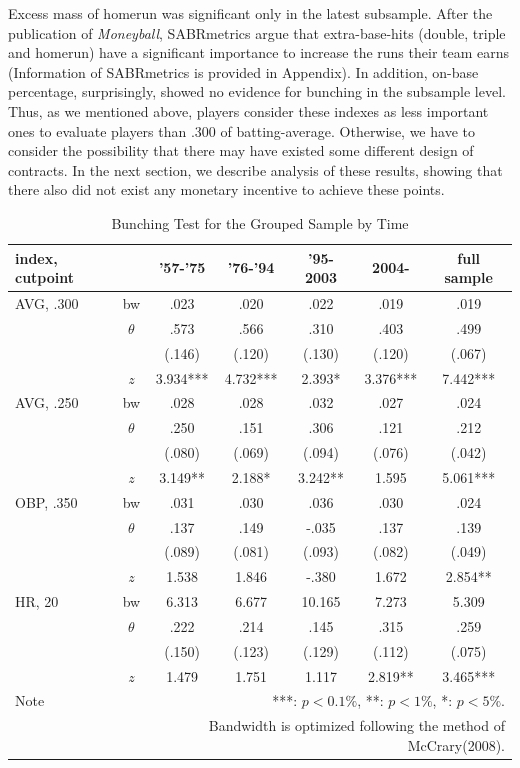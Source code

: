 \documentclass[dvipdfmx, 12pt]{article}
\begin{document}
Excess mass of homerun was significant only in the latest subsample. After the publication of \textit{Moneyball}, SABRmetrics argue that extra-base-hits (double, triple and homerun) have a significant importance to increase the runs their team earns (Information of SABRmetrics is provided in Appendix). In addition, on-base percentage, surprisingly, showed no evidence for bunching in the subsample level. Thus, as we mentioned above, players consider these indexes as less important ones to evaluate players than .300 of batting-average. Otherwise, we have to consider the possibility that there may have existed some different design of contracts. In the next section, we describe analysis of these results, showing that there also did not exist any monetary incentive to achieve these points.

\begin{table}[H]
  \centering
  \caption{Bunching Test for the Grouped Sample by Time}
  \label{Mani-Era}
  \footnotesize
  \begin{tabular}{lcccccc} \hline
    index, cutpoint &  & '57-'75 &'76-'94 & '95-2003 & 2004- &full sample \\ \hline \hline
    AVG, .300 & bw & .023 & .020 & .022 & .019 & .019 \\
    & $\theta$ & .573 & .566 & .310 & .403 & .499 \\
    & & (.146) & (.120) & (.130) & (.120) & (.067) \\
    & $z$ & 3.934*** & 4.732*** & 2.393* & 3.376*** & 7.442*** \\ \hline
    AVG, .250 & bw & .028 & .028 & .032 & .027 & .024 \\
    & $\theta$ & .250 & .151 & .306 & .121 & .212 \\
    & & (.080) & (.069) & (.094)& (.076) & (.042) \\
    & $z$ & 3.149** & 2.188* & 3.242** & 1.595 & 5.061*** \\ \hline
    OBP, .350 & bw & .031 & .030 & .036 & .030 & .024 \\
    & $\theta$ & .137 & .149 & -.035 & .137 & .139 \\
    & & (.089) & (.081) & (.093) & (.082) & (.049) \\
    & $z$ & 1.538 & 1.846 & -.380 & 1.672 & 2.854** \\ \hline
    HR, 20 & bw & 6.313 & 6.677 & 10.165 & 7.273 & 5.309 \\
    & $\theta$ & .222 & .214 & .145 & .315 & .259 \\
    & & (.150) & (.123) & (.129) & (.112) & (.075) \\
    & $z$ & 1.479 & 1.751 & 1.117 & 2.819** & 3.465*** \\ \hline
    Note & \multicolumn{6}{r}{
    ***: $p<0.1\%$, **: $p<1\%$, *: $p<5\%$.
    }\\
    & \multicolumn{6}{r}{
    Bandwidth is optimized following the method of McCrary(2008).
    }
  \end{tabular}
\end{table}
\end{document}
